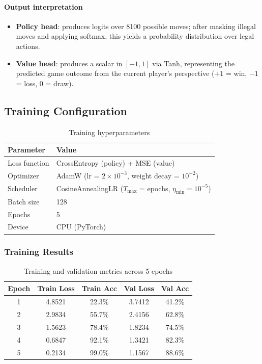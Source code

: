 \documentclass[a4paper,12pt]{article}
\begin{document}
\paragraph{Output interpretation}
\begin{itemize}
    \item \textbf{Policy head}: produces logits over 8100 possible moves; after masking illegal moves and applying softmax, this yields a probability distribution over legal actions.
    \item \textbf{Value head}: produces a scalar in $[-1, 1]$ via Tanh, representing the predicted game outcome from the current player's perspective ($+1$ = win, $-1$ = loss, $0$ = draw).
\end{itemize}

\subsection{Training Configuration}

\begin{table}[H]
\centering
\caption{Training hyperparameters}
\begin{tabular}{@{}ll@{}}
\toprule
\textbf{Parameter} & \textbf{Value} \\
\midrule
Loss function & CrossEntropy (policy) + MSE (value) \\
Optimizer & AdamW (lr = $2 \times 10^{-3}$, weight decay = $10^{-2}$) \\
Scheduler & CosineAnnealingLR ($T_{\max}$ = epochs, $\eta_{\min} = 10^{-5}$) \\
Batch size & 128 \\
Epochs & 5 \\
Device & CPU (PyTorch) \\
\bottomrule
\end{tabular}
\end{table}

\subsubsection{Training Results}

\begin{table}[H]
\centering
\caption{Training and validation metrics across 5 epochs}
\begin{tabular}{@{}ccccc@{}}
\toprule
\textbf{Epoch} & \textbf{Train Loss} & \textbf{Train Acc} & \textbf{Val Loss} & \textbf{Val Acc} \\
\midrule
1 & 4.8521 & 22.3\% & 3.7412 & 41.2\% \\
2 & 2.9834 & 55.7\% & 2.4156 & 62.8\% \\
3 & 1.5623 & 78.4\% & 1.8234 & 74.5\% \\
4 & 0.6847 & 92.1\% & 1.3421 & 82.3\% \\
5 & 0.2134 & 99.0\% & 1.1567 & 88.6\% \\
\bottomrule
\end{tabular}
\end{table}
\end{document}
